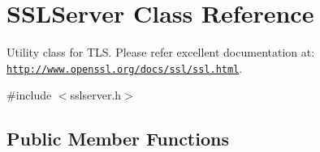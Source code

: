 \hypertarget{classSSLServer}{\section{S\-S\-L\-Server Class Reference}
\label{classSSLServer}
}


Utility class for T\-L\-S. Please refer excellent documentation at\-: \href{http://www.openssl.org/docs/ssl/ssl.html}{\tt http\-://www.\-openssl.\-org/docs/ssl/ssl.\-html}.  




{\ttfamily \#include $<$sslserver.\-h$>$}

\subsection*{Public Member Functions}
